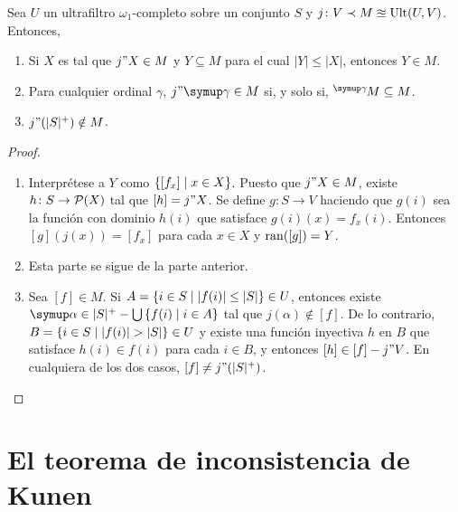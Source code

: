 \begin{teo}\label{teo:ultrafilters-omega1}
    Sea $U$ un ultrafiltro $\omega_1$-completo sobre un conjunto $S$ y
    $j\colon V\prec M\approxeq\operatorname{Ult}(U,V)$. Entonces,
    \begin{enumerate}[label=(\roman*)]
        \item Si $X$ es tal que $j"X\in M$ y $Y\subseteq M$ para el cual $|Y|\leq|X|$,
            entonces $Y\in M$.
        \item Para cualquier ordinal $\gamma$, $j"\gamma\in M$ si, y solo si,
            $\hbox{}^\gamma\kern-1pt M\subseteq M$.
        \item $j"(|S|^+)\notin M$.
    \end{enumerate}
\end{teo}

\begin{proof}\phantom{a}
    \begin{enumerate}[label=(\roman*)]
        \item Interprétese a $Y$ como $\left\{ [f_x]\mid x\in X \right\}$. Puesto que $j"X\in M$,
            existe $h\colon S\to\pwset{X}$ tal que $[h]=j"X$. Se define $g\colon S\to V$
            haciendo que $g(i)$ sea la función con dominio $h(i)$ que satisface
            $g(i)(x) = f_x(i)$. Entonces $[g](j(x)) = [f_x]$ para cada $x\in X$ y
            $\operatorname{ran}([g]) = Y$.
        \item Esta parte se sigue de la parte anterior.
        \item Sea $[f]\in M$. Si $A = \left\{ i\in S\mid |f(i)|\leq|S| \right\}\in U$,
            entonces existe $\alpha\in|S|^+ - \bigcup\set{f(i)\mid i\in A}$ tal que
            $j(\alpha)\notin [f]$. De lo contrario, $B=\set{i\in S\mid |f(i)|>|S|}\in U$
            y existe una función inyectiva $h$ en $B$ que satisface $h(i)\in f(i)$
            para cada $i\in B$, y entonces $[h]\in[f]-j"V$. En cualquiera de los dos casos,
            $[f]\neq j"(|S|^+)$.
    \end{enumerate}
\end{proof}

\fi
\ifmainproofs
\chapter{El teorema de inconsistencia de Kunen}
\label{cap:teorema-kunen}
\thispagestyle{empty}

